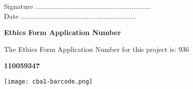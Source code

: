 \vspace{2em}
Signature ............................................................  \\

\vspace{1em}
Date ............................................................ \\

\begin{center}
    {\LARGE\bf Ethics Form Application Number}

The Ethics Form Application Number for this project is: 936
\end{center}

\vspace{5em}
\begin{center}
    {\LARGE\bf 110059347}

\texttt{[image: cba1-barcode.png]}
\end{center}
